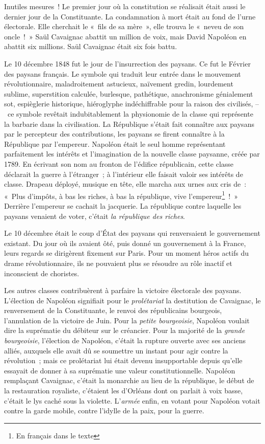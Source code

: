 \documentclass[french,twoside]{book} %
\begin{document}
Inutiles mesures ! Le premier jour où la constitution se réalisait était aussi le dernier jour de la Constituante. La condamnation à mort était au fond de l’urne électorale. Elle cherchait le « fils de sa mère », elle trouva le « neveu de son oncle ! » Saül Cavaignac abattit un million de voix, mais David Napoléon en abattit six millions. Saül Cavaignac était six fois battu.\par
Le 10 décembre 1848 fut le jour de l’insurrection des paysans. Ce fut le Février des paysans français. Le symbole qui traduit leur entrée dans le mouvement révolutionnaire, maladroitement astucieux, naïvement gredin, lourdement sublime, superstition calculée, burlesque, pathétique, anachronisme génialement sot, espièglerie historique, hiéroglyphe indéchiffrable pour la raison des civilisés, – ce symbole revêtait indubitablement la physionomie de la classe qui représente la barbarie dans la civilisation. La République s’était fait connaître aux paysans par le percepteur des contributions, les paysans se firent connaître à la République par l’empereur. Napoléon était le seul homme représentant parfaitement les intérêts et l’imagination de la nouvelle classe paysanne, créée par 1789. En écrivant son nom au fronton de l’édifice républicain, cette classe déclarait la guerre à l’étranger ; à l’intérieur elle faisait valoir ses intérêts de classe. Drapeau déployé, musique en tête, elle marcha aux urnes aux cris de : « Plus d’impôts, à bas les riches, à bas la république, vive l’empereur\footnote{En français dans le texte} ! » Derrière l’empereur se cachait la jacquerie. La république contre laquelle les paysans venaient de voter, c’était \emph{la république des riches}.\par
Le 10 décembre était le coup d’État des paysans qui renversaient le gouvernement existant. Du jour où ils avaient ôté, puis donné un gouvernement à la France, leurs regards se dirigèrent fixement sur Paris. Pour un moment héros actifs du drame révolutionnaire, ils ne pouvaient plus se résoudre au rôle inactif et inconscient de choristes.\par
Les autres classes contribuèrent à parfaire la victoire électorale des paysans. L’élection de Napoléon signifiait pour le \emph{prolétariat} la destitution de Cavaignac, le renversement de la Constituante, le renvoi des républicains bourgeois, l’annulation de la victoire de Juin. Pour la \emph{petite bourgeoisie}, Napoléon voulait dire la suprématie du débiteur sur le créancier. Pour la majorité de la \emph{grande bourgeoisie}, l’élection de Napoléon, c’était la rupture ouverte avec ses anciens alliés, auxquels elle avait dû se soumettre un instant pour agir contre la révolution ; mais ce prolétariat lui était devenu insupportable depuis qu’elle essayait de donner à sa suprématie une valeur constitutionnelle. Napoléon remplaçant Cavaignac, c’était la monarchie au lieu de la république, le début de la restauration royaliste, c’étaient les d’Orléans dont on parlait à voix basse, c’était le lys caché sous la violette. L’\emph{armée} enfin, en votant pour Napoléon votait contre la garde mobile, contre l’idylle de la paix, pour la guerre.\par
\end{document}
